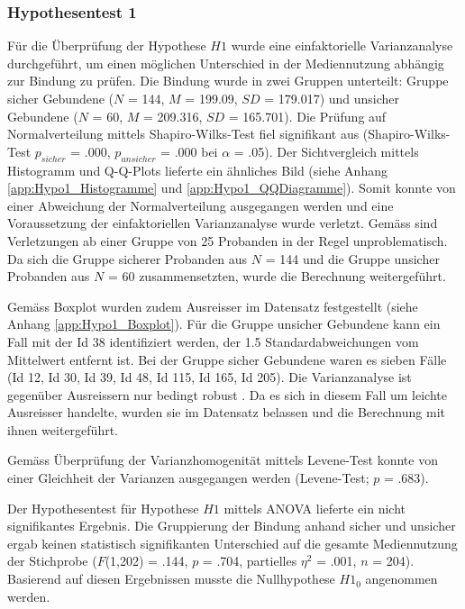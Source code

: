 \subsubsection{Hypothesentest 1}\label{sec:Hypothesentest1}
Für die Überprüfung der Hypothese $H1$ wurde eine einfaktorielle Varianzanalyse durchgeführt, um einen möglichen Unterschied in der Mediennutzung abhängig zur Bindung zu prüfen. Die Bindung wurde in zwei Gruppen unterteilt: Gruppe sicher Gebundene ($N$ = 144, $M$ = 199.09, $SD$ = 179.017) und unsicher Gebundene ($N$ = 60, $M$ = 209.316, $SD$ = 165.701). Die Prüfung auf Normalverteilung mittels Shapiro-Wilks-Test \cite{Shapiro1965} fiel signifikant aus (Shapiro-Wilks-Test $p_{sicher}$ = .000, $p_{unsicher}$ = .000 bei $\alpha$ = .05). Der Sichtvergleich mittels Histogramm und Q-Q-Plots lieferte ein ähnliches Bild (siehe Anhang \ref{app:Hypo1_Histogramme} und \ref{app:Hypo1_QQDiagramme}). Somit konnte von einer Abweichung der Normalverteilung ausgegangen werden \cite{Hemmerich2018} und eine Voraussetzung der einfaktoriellen Varianzanalyse wurde verletzt. Gemäss  sind Verletzungen ab einer Gruppe von 25 Probanden in der Regel unproblematisch. Da sich die Gruppe sicherer Probanden aus $N$ = 144 und die Gruppe unsicher Probanden aus $N$ = 60 zusammensetzten, wurde die Berechnung weitergeführt.

Gemäss Boxplot wurden zudem Ausreisser im Datensatz festgestellt (siehe Anhang \ref{app:Hypo1_Boxplot}). Für die Gruppe unsicher Gebundene kann ein Fall mit der Id 38 identifiziert werden, der 1.5 Standardabweichungen vom Mittelwert entfernt ist. Bei der Gruppe sicher Gebundene waren es sieben Fälle (Id 12, Id 30, Id 39, Id 48, Id 115, Id 165, Id 205). Die Varianzanalyse ist gegenüber Ausreissern nur bedingt robust \cite{Hemmerich2018}. Da es sich in diesem Fall um leichte Ausreisser handelte, wurden sie im Datensatz belassen und die Berechnung mit ihnen weitergeführt.  

Gemäss Überprüfung der Varianzhomogenität mittels Levene-Test konnte von einer Gleichheit der Varianzen ausgegangen werden (Levene-Test; $p$ = .683). 

Der Hypothesentest für Hypothese $H1$ mittels ANOVA lieferte ein nicht signifikantes Ergebnis. Die Gruppierung der Bindung anhand sicher und unsicher ergab keinen statistisch signifikanten Unterschied auf die gesamte Mediennutzung der Stichprobe ($F$(1,202) = .144, $p$ = .704, partielles $\eta^2$ = .001, $n$ = 204). Basierend auf diesen Ergebnissen musste die Nullhypothese $H1_{0}$ angenommen werden. 

